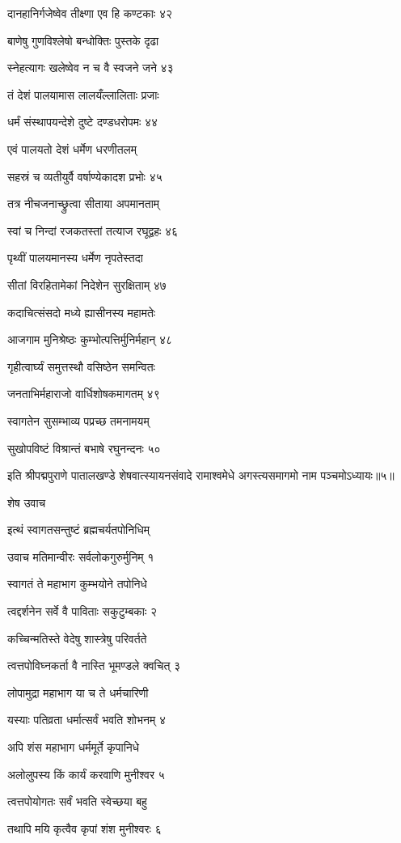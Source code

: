 दानहानिर्गजेष्वेव तीक्ष्णा एव हि कण्टकाः ४२

बाणेषु गुणविश्लेषो बन्धोक्तिः पुस्तके दृढा

स्नेहत्यागः खलेष्वेव न च वै स्वजने जने ४३

तं देशं पालयामास लालयँल्लालिताः प्रजाः

धर्मं संस्थापयन्देशे दुष्टे दण्डधरोपमः ४४

एवं पालयतो देशं धर्मेण धरणीतलम्

सहस्रं च व्यतीयुर्वै वर्षाण्येकादश प्रभोः ४५

तत्र नीचजनाच्छ्रुत्वा सीताया अपमानताम्

स्वां च निन्दां रजकतस्तां तत्याज रघूद्वहः ४६

पृथ्वीं पालयमानस्य धर्मेण नृपतेस्तदा

सीतां विरहितामेकां निदेशेन सुरक्षिताम् ४७

कदाचित्संसदो मध्ये ह्यासीनस्य महामतेः

आजगाम मुनिश्रेष्ठः कुम्भोत्पत्तिर्मुनिर्महान् ४८

गृहीत्वार्घ्यं समुत्तस्थौ वसिष्ठेन समन्वितः

जनताभिर्महाराजो वार्धिशोषकमागतम् ४९

स्वागतेन सुसम्भाव्य पप्रच्छ तमनामयम्

सुखोपविष्टं विश्रान्तं बभाषे रघुनन्दनः ५०

इति श्रीपद्मपुराणे पातालखण्डे शेषवात्स्यायनसंवादे रामाश्वमेधे अगस्त्यसमागमो नाम पञ्चमोऽध्यायः॥५॥


शेष उवाच

इत्थं स्वागतसन्तुष्टं ब्रह्मचर्यतपोनिधिम्

उवाच मतिमान्वीरः सर्वलोकगुरुर्मुनिम् १

स्वागतं ते महाभाग कुम्भयोने तपोनिधे

त्वद्दर्शनेन सर्वे वै पाविताः सकुटुम्बकाः २

कच्चिन्मतिस्ते वेदेषु शास्त्रेषु परिवर्तते

त्वत्तपोविघ्नकर्ता वै नास्ति भूमण्डले क्वचित् ३

लोपामुद्रा महाभाग या च ते धर्मचारिणी

यस्याः पतिव्रता धर्मात्सर्वं भवति शोभनम् ४

अपि शंस महाभाग धर्ममूर्ते कृपानिधे

अलोलुपस्य किं कार्यं करवाणि मुनीश्वर ५

त्वत्तपोयोगतः सर्वं भवति स्वेच्छया बहु

तथापि मयि कृत्वैव कृपां शंश मुनीश्वरः ६


